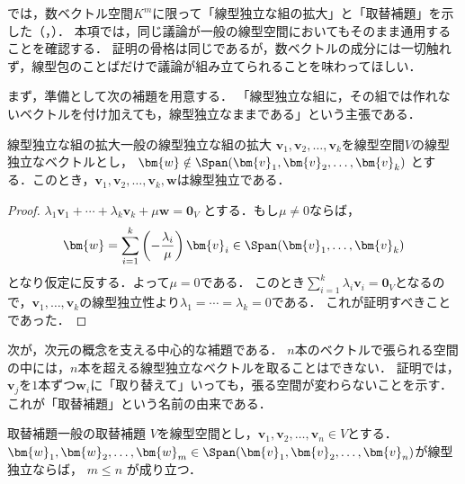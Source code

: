 では，数ベクトル空間$K^m$に限って「線型独立な組の拡大」と「取替補題」を示した（，）．
本項では，同じ議論が一般の線型空間においてもそのまま通用することを確認する．
証明の骨格は同じであるが，数ベクトルの成分には一切触れず，線型包のことばだけで議論が組み立てられることを味わってほしい．

まず，準備として次の補題を用意する．
「線型独立な組に，その組では作れないベクトルを付け加えても，線型独立なままである」という主張である．

\begin{lemma}{線型独立な組の拡大}{一般の線型独立な組の拡大}
  $\bm{v}_1, \bm{v}_2, \dots, \bm{v}_k$を線型空間$V$の線型独立なベクトルとし，
  $\bm{w} \notin \Span(\bm{v}_1, \bm{v}_2, \dots, \bm{v}_k)$
  とする．このとき，$\bm{v}_1, \bm{v}_2, \dots, \bm{v}_k, \bm{w}$は線型独立である．
\end{lemma}

\begin{tleftbar}
\begin{proof}
  $\lambda_1 \bm{v}_1 + \cdots + \lambda_k \bm{v}_k + \mu \bm{w} = \bm{0}_V$
  とする．もし$\mu \ne 0$ならば，
  \[
    \bm{w} = \sum_{i=1}^{k} \left(-\frac{\lambda_i}{\mu}\right) \bm{v}_i
    \in \Span(\bm{v}_1, \dots, \bm{v}_k)
  \]
  となり仮定に反する．よって$\mu = 0$である．
  このとき$\sum_{i=1}^{k} \lambda_i \bm{v}_i = \bm{0}_V$となるので，$\bm{v}_1, \dots, \bm{v}_k$の線型独立性より$\lambda_1 = \cdots = \lambda_k = 0$である．
  これが証明すべきことであった．
\end{proof}
\end{tleftbar}

次が，次元の概念を支える中心的な補題である．
$n$本のベクトルで張られる空間の中には，$n$本を超える線型独立なベクトルを取ることはできない．
証明では，$\bm{v}_j$を$1$本ずつ$\bm{w}_i$に「取り替えて」いっても，張る空間が変わらないことを示す．
これが「取替補題」という名前の由来である．

\begin{lemma}{取替補題}{一般の取替補題}
  $V$を線型空間とし，$\bm{v}_1, \bm{v}_2, \dots, \bm{v}_n \in V$とする．
  $\bm{w}_1, \bm{w}_2, \dots, \bm{w}_m \in \Span(\bm{v}_1, \bm{v}_2, \dots, \bm{v}_n)$が線型独立ならば，
  $m \le n$
  が成り立つ．
\end{lemma}

